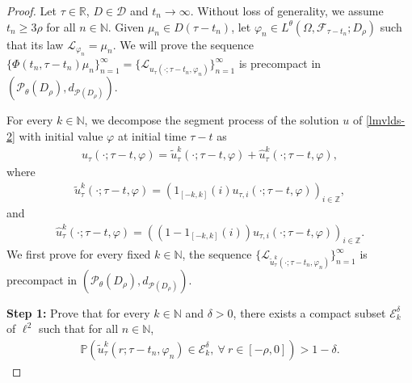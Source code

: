 \documentclass[11pt]{article}
\numberwithin{equation}{section}
\theoremstyle{plain}
\begin{document}
\begin{proof}
 Let $\tau \in \mathbb{R}$, $D \in \mathcal{D}$
 and  $t_n \to  \infty$.
 Without loss of generality, 
 we  assume $t_n \ge 3\rho$ for all $n \in \mathbb{N}$.
 Given  $\mu_n \in D(\tau - t_n)$,
 let $\varphi_n \in L^{\theta}(\Omega, \mathcal{F}_{\tau-t_n}; D_{\rho} )$ such that its law $\mathcal{L}_{\varphi_n} = \mu_n$.
 We will prove the sequence
    $\{ \Phi(t_n, \tau-t_n) \mu_n \}_{n=1}^{\infty}
    = \{ \mathcal{L}_{u_\tau(\cdot; \tau-t_n, \varphi_n) } \}_{n=1}^{\infty}$
 is precompact  in
    $(\mathcal{P}_{\theta}(D_{\rho}), d_{\mathcal{P}(D_{\rho})})$.
     
     
      For every
  $k \in \mathbb{N}$, we decompose the segment process of
  the  solution $u$ of  \eqref{lmvlds-2}
  with initial value $\varphi$ at initial time $\tau-t$
   as
 \begin{align}\label{feb24a}
    u_{\tau}(\cdot; \tau-t,\varphi)
    = \widetilde{u}_\tau^k(\cdot; \tau-t,\varphi)
      + \widehat{u}_\tau^k(\cdot; \tau-t,\varphi),
 \end{align}
 where
 \begin{align}\label{feb24b}
    \widetilde{u}_\tau^k(\cdot; \tau-t,\varphi)
    = \left( {1}_{[-k,k]}(i) u_{\tau,i}(\cdot; \tau-t,\varphi) \right)_{i \in \mathbb{Z}},
 \end{align}
 and
 \begin{align}\label{feb24c}
    \widehat{u}_\tau^k(\cdot;\tau-t,\varphi)
    = \left( (1 - {1}_{[-k,k]}(i)) u_{\tau,i}(\cdot; \tau-t,\varphi) \right)_{i \in \mathbb{Z}}.
 \end{align}
     We first
     prove for every  fixed $k\in \mathbb{N}$,
     the sequence
     $ \{ \mathcal{L}_{ 
      \widetilde{u}_\tau^k
     (\cdot; \tau-t_n, \varphi_n) } \}_{n=1}^{\infty}$
 is precompact  in
    $(\mathcal{P}_{\theta}(D_{\rho}), d_{\mathcal{P}(D_{\rho})})$.
 
 \textbf{Step 1:} Prove that for every
  $k \in \mathbb{N}$ and 
  $\delta> 0$,
 there exists a compact subset $\mathcal{E}^\delta_k$ of $\ell^2$
 such that for all $n \in \mathbb{N}$,
    \begin{align}\label{feb25a}
         \mathbb{P} 
                   \left( 
                    \widetilde{u}_\tau^k
                   (r; \tau-t_n, \varphi_n) \in \mathcal{E}^\delta_k, \  
                             \forall \  r \in [-\rho, 0]
                   \right) 
           > 1 - \delta.
\end{align}
  

\end{proof}
\end{document}
